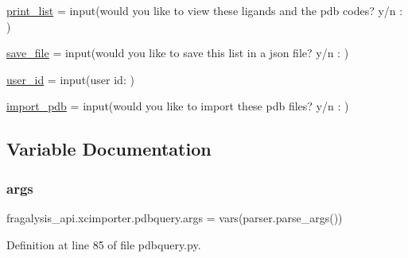 \begin{DoxyCompactItemize}
\item 
\hyperlink{namespacefragalysis__api_1_1xcimporter_1_1pdbquery_a86c375701bbb49fc0670930962e1d2ee}{print\+\_\+list} = input(\textquotesingle{}would you like to view these ligands and the pdb codes? y/n \+: \textquotesingle{})
\item 
\hyperlink{namespacefragalysis__api_1_1xcimporter_1_1pdbquery_a19f95edc9111d90eafa40886ee98423c}{save\+\_\+file} = input(\textquotesingle{}would you like to save this list in a json file? y/n \+: \textquotesingle{})
\item 
\hyperlink{namespacefragalysis__api_1_1xcimporter_1_1pdbquery_a91f879693753cc8b9a1fb254c075368e}{user\+\_\+id} = input(\textquotesingle{}user id\+: \textquotesingle{})
\item 
\hyperlink{namespacefragalysis__api_1_1xcimporter_1_1pdbquery_a79bb87d0ca3ad7b21d937ab25dc37b21}{import\+\_\+pdb} = input(\textquotesingle{}would you like to import these pdb files? y/n \+: \textquotesingle{})
\end{DoxyCompactItemize}


\subsection{Variable Documentation}
\mbox{\label{namespacefragalysis__api_1_1xcimporter_1_1pdbquery_aa63ace70140ec79679f3f8be87bb2564}} 
\subsubsection{\texorpdfstring{args}{args}}
{\footnotesize\ttfamily fragalysis\+\_\+api.\+xcimporter.\+pdbquery.\+args = vars(parser.\+parse\+\_\+args())}



Definition at line 85 of file pdbquery.\+py.

\mbox{\label{namespacefragalysis__api_1_1xcimporter_1_1pdbquery_a76497bee6f8c2a47827613858ded72d5}} 
